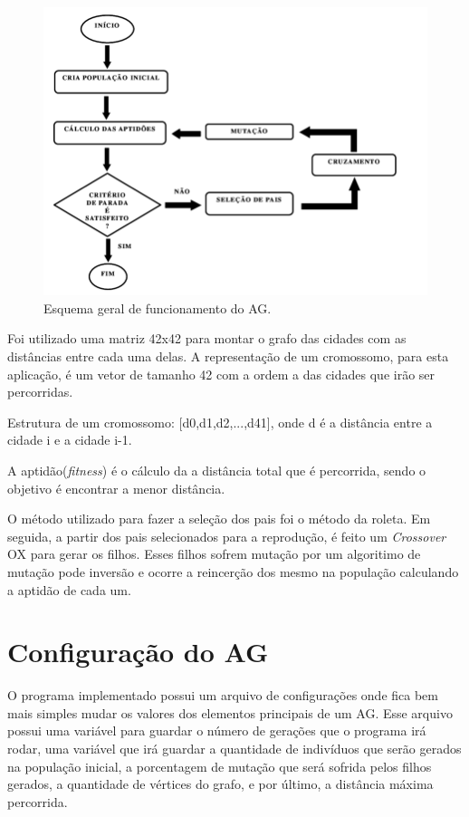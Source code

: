 \documentclass[
article,			%
11pt,				%
oneside,			%
a4paper,			%
english,			%
brazil,				%
sumario=tradicional
]{article}
\begin{document}
	\begin{figure}[H]
		\centering
		\includegraphics[width=1\textwidth]{Figuras/funcionamento-ag.png}
		\caption{Esquema geral de funcionamento do AG.}
	\end{figure}

	Foi utilizado uma matriz 42x42 para montar o grafo das cidades com as distâncias entre cada uma delas. 
	A representação de um cromossomo, para esta aplicação, é um vetor de tamanho 42 com a ordem a das cidades que irão ser percorridas. 
	
	Estrutura de um cromossomo: [d0,d1,d2,...,d41], onde d é a distância entre a cidade i e a cidade i-1.
	
	A aptidão(\textit{fitness}) é o cálculo da a distância total que é percorrida, sendo o objetivo é encontrar a menor distância.
	
	O método utilizado para fazer a seleção dos pais foi o método da roleta. Em seguida, a partir dos pais selecionados para a reprodução, é feito um \textit{Crossover} OX para gerar os filhos. Esses filhos sofrem mutação por um algoritimo de mutação pode inversão e ocorre a reincerção dos mesmo na população calculando a aptidão de cada um.
	
	
	\section{Configuração do AG}
	
	O programa implementado possui um arquivo de configurações onde fica bem mais simples mudar os valores dos elementos principais de um AG.
	Esse arquivo possui uma variável para guardar o número de gerações que o programa irá rodar, uma variável que irá guardar a quantidade de indivíduos que serão gerados na população inicial, a porcentagem de mutação que será sofrida pelos filhos gerados, a quantidade de vértices do grafo, e por último, a distância máxima percorrida. 
	
\end{document}
